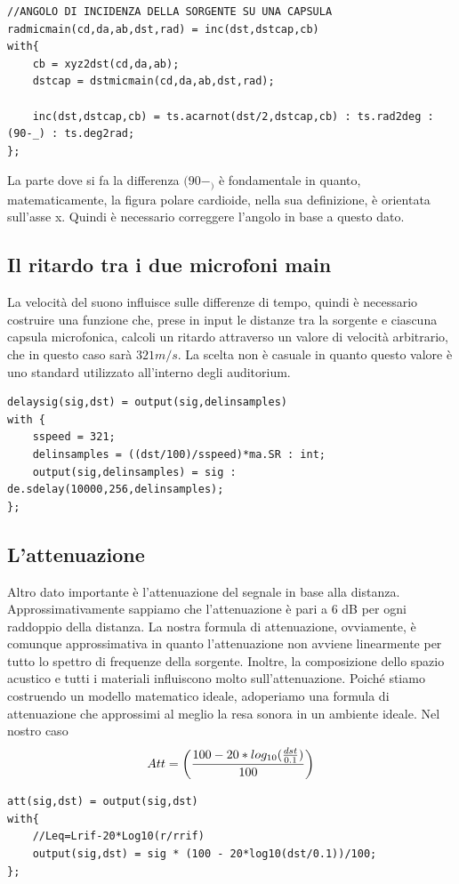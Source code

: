 \documentclass{article}
\begin{document}
    \begin{lstlisting}
//ANGOLO DI INCIDENZA DELLA SORGENTE SU UNA CAPSULA
radmicmain(cd,da,ab,dst,rad) = inc(dst,dstcap,cb)
with{
    cb = xyz2dst(cd,da,ab);
    dstcap = dstmicmain(cd,da,ab,dst,rad);
    
    inc(dst,dstcap,cb) = ts.acarnot(dst/2,dstcap,cb) : ts.rad2deg : (90-_) : ts.deg2rad;
};
    \end{lstlisting}

    La parte dove si fa la differenza $(90-_)$ è fondamentale in quanto, matematicamente, la figura polare cardioide, nella sua definizione, è orientata sull'asse x. Quindi è necessario correggere l'angolo in base a questo dato.\\
\subsection{Il ritardo tra i due microfoni main}
    La velocità del suono influisce sulle differenze di tempo, quindi è necessario costruire una funzione che, prese in input le distanze tra la sorgente e ciascuna capsula microfonica, calcoli un ritardo attraverso un valore di velocità arbitrario, che in questo caso sarà $321 m/s$. La scelta non è casuale in quanto questo valore è uno standard utilizzato all'interno degli auditorium.

    \begin{lstlisting}
delaysig(sig,dst) = output(sig,delinsamples)
with {
    sspeed = 321;
    delinsamples = ((dst/100)/sspeed)*ma.SR : int;
    output(sig,delinsamples) = sig : de.sdelay(10000,256,delinsamples);
};
    \end{lstlisting}
    
\subsection{L'attenuazione}
    Altro dato importante è l'attenuazione del segnale in base alla distanza. Approssimativamente sappiamo che l'attenuazione è pari a 6 dB per ogni raddoppio della distanza. La nostra formula di attenuazione, ovviamente, è comunque approssimativa in quanto l'attenuazione non avviene linearmente per tutto lo spettro di frequenze della sorgente. Inoltre, la composizione dello spazio acustico e tutti i materiali influiscono molto sull'attenuazione. Poiché stiamo costruendo un modello matematico ideale, adoperiamo una formula di attenuazione che approssimi al meglio la resa sonora in un ambiente ideale. Nel nostro caso\\
    $$Att = \biggl({100 - 20*log_{10}(\frac{dst}{0.1})\over100} \biggr)$$
\begin{lstlisting}
att(sig,dst) = output(sig,dst)
with{
    //Leq=Lrif-20*Log10(r/rrif)
    output(sig,dst) = sig * (100 - 20*log10(dst/0.1))/100;
};
\end{lstlisting}
\end{document}
